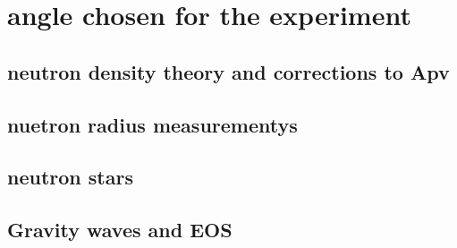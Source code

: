 \section{angle chosen for the experiment}


\subsection{neutron density theory and corrections to Apv}
\subsection{nuetron radius measurementys}
\subsection{neutron stars}
\subsection{Gravity waves and EOS}


